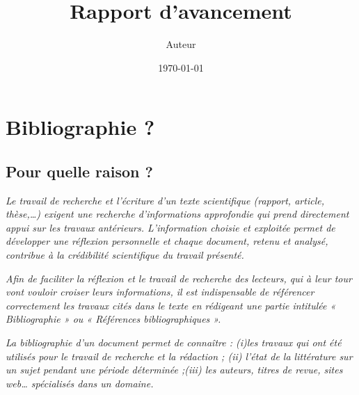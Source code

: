 \documentclass[a4paper,12pt]{report}
\author{Auteur}
\title{Rapport d'avancement}
\date{\today}
\begin{document}
\graphicspath{{Figures/}}




\renewcommand\contentsname{Sommaire}
\setcounter{chapter}{1}
\tableofcontents



\newpage

\section{Bibliographie ?}
\subsection{Pour quelle raison ?}
\textit{Le travail de recherche et l'écriture d'un texte scientifique (rapport, article, thèse,…) exigent une recherche d'informations approfondie qui prend directement appui sur les travaux antérieurs. L'information choisie et exploitée permet de développer une réflexion personnelle et chaque document, retenu et analysé, contribue à la crédibilité scientifique du travail présenté. \\}

\textit{Afin de faciliter la réflexion et le travail de recherche des lecteurs, qui à leur tour vont vouloir croiser leurs informations, il est indispensable de référencer correctement les travaux cités dans le texte en rédigeant une partie intitulée « Bibliographie » ou « Références bibliographiques ». \\}

\textit{La bibliographie d'un document permet de connaître : (i)les travaux qui ont été utilisés pour le travail de recherche et la rédaction ; (ii) l’état de la littérature sur un sujet pendant une période déterminée ;(iii) les auteurs, titres de revue, sites web… spécialisés dans un domaine.} \\
\end{document}
